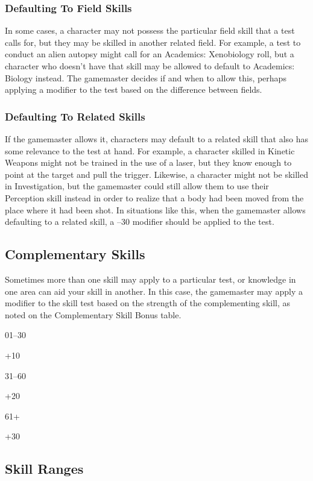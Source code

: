 \subsubsection{Defaulting To Field Skills}

In some cases, a character may not possess the particular
field skill that a test calls for, but they may be
skilled in another related field. For example, a test to 
conduct an alien autopsy might call for an Academics: 
Xenobiology roll, but a character who doesn't have 
that skill may be allowed to default to Academics: 
Biology instead. The gamemaster decides if and when 
to allow this, perhaps applying a modifier to the test 
based on the difference between fields.

\subsubsection{Defaulting To Related Skills}

If the gamemaster allows it, characters may default to 
a related skill that also has some relevance to the test 
at hand. For example, a character skilled in Kinetic 
Weapons might not be trained in the use of a laser, but 
they know enough to point at the target and pull the 
trigger. Likewise, a character might not be skilled in 
Investigation, but the gamemaster could still allow 
them to use their Perception skill instead in order to 
realize that a body had been moved from the place 
where it had been shot. In situations like this, when the 
gamemaster allows defaulting to a related skill, a –30 
modifier should be applied to the test.

\subsection{Complementary Skills}

Sometimes more than one skill may apply to a particular
test, or knowledge in one area can aid your skill
in another. In this case, the gamemaster may apply a 
modifier to the skill test based on the strength of the 
complementing skill, as noted on the Complementary 
Skill Bonus table.

01–30

+10

31–60

+20

61+

+30

\subsection{Skill Ranges}

